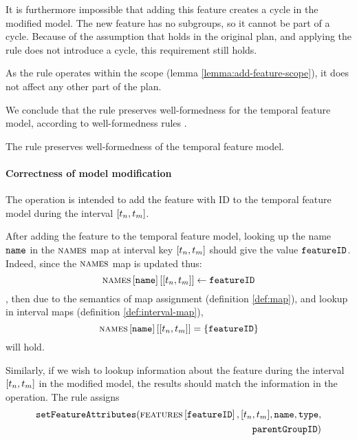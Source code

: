 It is furthermore impossible that adding this feature creates a cycle in the modified model. The new feature has no subgroups, so it cannot be part of a cycle. Because of the assumption that  holds in the original plan, and applying the rule does not introduce a cycle, this requirement still holds. 

As the rule operates within the scope (lemma \vref{lemma:add-feature-scope}), it does not affect any other part of the plan.

We conclude that the  rule preserves well-formedness for the temporal feature model, according to well-formedness rules . 
\\
\begin{lemma}
   The  rule preserves well-formedness of the temporal feature model.
   \label{lemma:add-feature-well-formed}
\end{lemma}

\paragraph{Correctness of model modification}

The operation is intended to add the feature with ID  to the temporal feature model during the interval $\interval{t_n}{t_m}$. 

After adding the feature to the temporal feature model, looking up the name $\texttt{name}$ in the $\textsc{names}{}$ map at interval key $\interval{t_n}{t_m}$ should give the value $\texttt{featureID}$. Indeed, since the $\textsc{names}{}$ map is updated thus:
\[
   \lookup{\lookup{\names}{\var{name}}}{\interval{t_n}{t_m}} \assign \var{featureID}
\]
, then due to the semantics of map assignment (definition \vref{def:map}), and lookup in interval maps (definition \vref{def:interval-map}),
\[
   \lookup{\lookup{\names}{\var{name}}}{\interval{t_n}{t_m}} = \set{\var{featureID}}
\]
will hold.

Similarly, if we wish to lookup information about the feature during the interval $\interval{t_n}{t_m}$ in the modified model, the results should match the information in the operation. The rule assigns 
\begin{equation*}
   \begin{split}
   \var{setFeatureAttributes}(\lookup{\features{}}{\var{featureID}}, \interval{t_n}{t_m}, \var{name}, \var{type}, \\
   \var{parentGroupID})
   \end{split}
\end{equation*}

